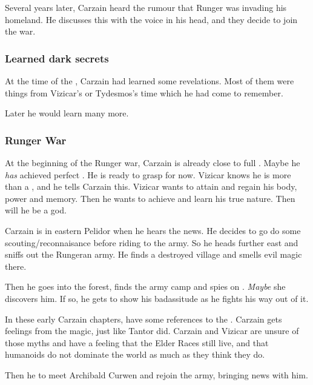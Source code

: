 Several years later, Carzain heard the rumour that Runger was invading his homeland. 
He discusses this with the voice in his head, and they decide to join the war. 






\subsubsection{Learned dark secrets}
At the time of the , Carzain had learned some  revelations.
Most of them were things from Vizicar's or Tydesmos's time which he had come to remember. 

Later he would learn many more. 






\subsubsection{Runger War}
At the beginning of the Runger war, Carzain is already close to full \kenosis. 
Maybe he \emph{has} achieved perfect \kenosis. 
He is ready to grasp for \apotheosis{} now.
Vizicar knows he is more than a \human, and he tells Carzain this. 
Vizicar wants to attain \kenosis{} and regain his body, power and memory. 
Then he wants to achieve \apotheosis{} and learn his true nature.
Then will he be a god. 

Carzain is in eastern Pelidor when he hears the news. 
He decides to go do some scouting/reconnaisance before riding to the army. 
So he heads further east and sniffs out the Rungeran army. 
He finds a destroyed village and smells evil magic there. 

Then he goes into the forest, finds the army camp and spies on \Takestsha. 
\emph{Maybe} she discovers him. 
If so, he gets to show his badassitude as he fights his way out of it. 

In these early Carzain chapters, have some references to the . 
Carzain gets  feelings from the \EreshKali{} magic, just like Tantor did. 
Carzain and Vizicar are unsure of those myths and have a feeling that the Elder Races still live, and that humanoids do not dominate the world as much as they think they do. 

Then he  to meet Archibald Curwen and rejoin the army, bringing news with him. 

